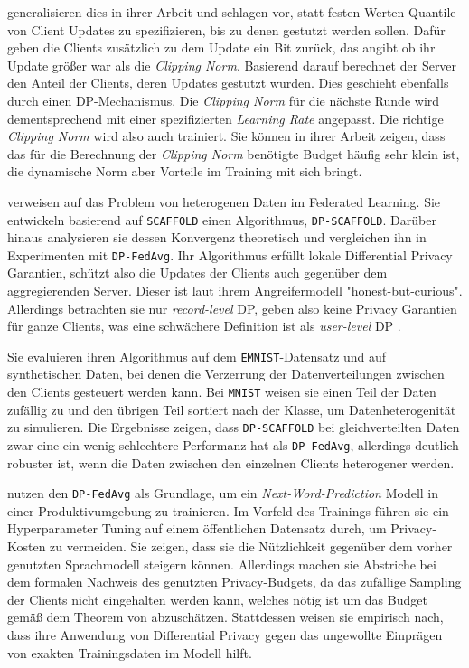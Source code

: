 \textcite{andrew:2021} generalisieren dies in ihrer Arbeit und schlagen vor, statt festen Werten Quantile von Client Updates zu spezifizieren, bis zu denen gestutzt werden sollen. Dafür geben die Clients zusätzlich zu dem Update ein Bit zurück, das angibt ob ihr Update größer war als die \textit{Clipping Norm}. Basierend darauf berechnet der Server den Anteil der Clients, deren Updates gestutzt wurden. Dies geschieht ebenfalls durch einen DP-Mechanismus. Die \textit{Clipping Norm} für die nächste Runde wird dementsprechend mit einer spezifizierten \textit{Learning Rate} angepasst. Die richtige \textit{Clipping Norm} wird also auch trainiert. Sie können in ihrer Arbeit zeigen, dass das für die Berechnung der \textit{Clipping Norm} benötigte Budget häufig sehr klein ist, die dynamische Norm aber Vorteile im Training mit sich bringt.

\textcite{noble:2023} verweisen auf das Problem von heterogenen Daten im Federated Learning. Sie entwickeln basierend auf \texttt{SCAFFOLD} einen Algorithmus, \texttt{DP-SCAFFOLD}. Darüber hinaus analysieren sie dessen Konvergenz theoretisch und vergleichen ihn in Experimenten mit \texttt{DP-FedAvg}. Ihr Algorithmus erfüllt lokale Differential Privacy Garantien, schützt also die Updates der Clients auch gegenüber dem aggregierenden Server. Dieser ist laut ihrem Angreifermodell "honest-but-curious". Allerdings betrachten sie nur \textit{record-level} DP, geben also keine Privacy Garantien für ganze Clients, was eine schwächere Definition ist als \textit{user-level} DP \cite[p.44]{kairouz:2021}.

Sie evaluieren ihren Algorithmus auf dem \texttt{EMNIST}-Datensatz und auf synthetischen Daten, bei denen die Verzerrung der Datenverteilungen zwischen den Clients gesteuert werden kann. Bei \texttt{MNIST} weisen sie einen Teil der Daten zufällig zu und den übrigen Teil sortiert nach der Klasse, um Datenheterogenität zu simulieren. Die Ergebnisse zeigen, dass \texttt{DP-SCAFFOLD} bei gleichverteilten Daten zwar eine ein wenig schlechtere Performanz hat als \texttt{DP-FedAvg}, allerdings deutlich robuster ist, wenn die Daten zwischen den einzelnen Clients heterogener werden.

\textcite{ramaswamy:2020} nutzen den \texttt{DP-FedAvg} als Grundlage, um ein \textit{Next-Word-Prediction} Modell in einer Produktivumgebung zu trainieren. Im Vorfeld des Trainings führen sie ein Hyperparameter Tuning auf einem öffentlichen Datensatz durch, um Privacy-Kosten zu vermeiden. Sie zeigen, dass sie die Nützlichkeit gegenüber dem vorher genutzten Sprachmodell steigern können. Allerdings machen sie Abstriche bei dem formalen Nachweis des genutzten Privacy-Budgets, da das zufällige Sampling der Clients nicht eingehalten werden kann, welches nötig ist um das Budget gemäß dem Theorem von \textcite{wang:2020} abzuschätzen. Stattdessen weisen sie empirisch nach, dass ihre Anwendung von Differential Privacy gegen das ungewollte Einprägen von exakten Trainingsdaten im Modell hilft.


